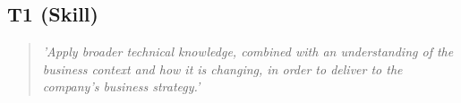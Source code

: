 \subsection{T1 (Skill)}

  \begin{quote}
    \textit{'Apply broader technical knowledge, combined
    with an understanding of the business context and how it
    is changing, in order to deliver to the company’s business
    strategy.'}
  \end{quote}

\newpage